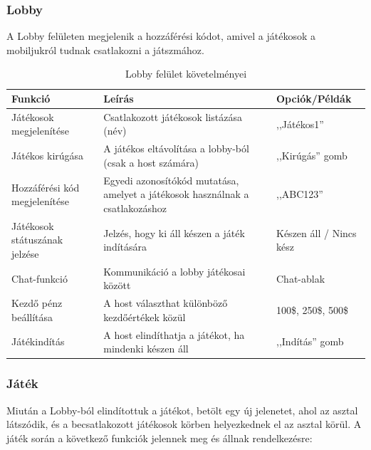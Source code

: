 \documentclass[]{thesis-ekf}
\theoremstyle{definition}
\theoremstyle{remark}
\begin{document}
\subsubsection{Lobby}
A Lobby felületen megjelenik a hozzáférési kódot, amivel a játékosok a mobiljukról tudnak csatlakozni a játszmához.

\begin{table}[ht!]
	\centering
	\footnotesize
	\begin{tabular}{|p{4cm}|p{7cm}|p{4cm}|}
		\hline
		\textbf{Funkció} & \textbf{Leírás} & \textbf{Opciók/Példák} \\ 
		\hline
		Játékosok megjelenítése & Csatlakozott játékosok listázása (név) & ,,Játékos1'' \\ 
		\hline
		Játékos kirúgása & A játékos eltávolítása a lobby-ból (csak a host számára) & ,,Kirúgás'' gomb \\ 
		\hline
		Hozzáférési kód megjelenítése & Egyedi azonosítókód mutatása, amelyet a játékosok használnak a csatlakozáshoz & ,,ABC123'' \\ 
		\hline
		Játékosok státuszának jelzése & Jelzés, hogy ki áll készen a játék indítására & Készen áll / Nincs kész \\ 
		\hline
		Chat-funkció & Kommunikáció a lobby játékosai között & Chat-ablak \\ 
		\hline
		Kezdő pénz beállítása & A host választhat különböző kezdőértékek közül & 100\$, 250\$, 500\$ \\ 
		\hline
		Játékindítás & A host elindíthatja a játékot, ha mindenki készen áll & ,,Indítás'' gomb \\ 
		\hline
	\end{tabular}
	\caption{Lobby felület követelményei}
\end{table}

\subsubsection{Játék}
Miután a Lobby-ból elindítottuk a játékot, betölt egy új jelenetet, ahol az asztal látszódik, és a becsatlakozott játékosok körben helyezkednek el az asztal körül. A játék során a következő funkciók jelennek meg és állnak rendelkezésre:
\end{document}
